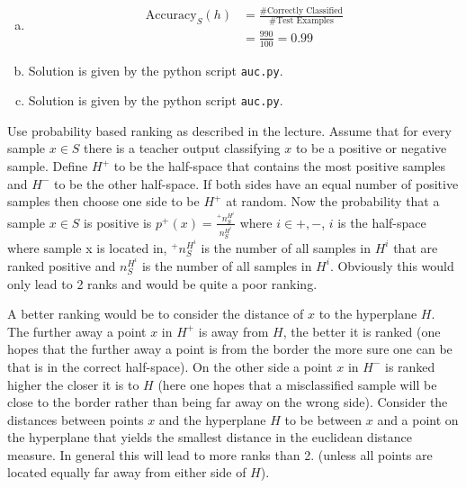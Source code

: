 \documentclass[10pt,a4paper,boxed]{hmcpset}
\begin{document}
		\begin{problem}[4. AUC]
				\end{problem}
		
		\begin{solution}		
					\begin{enumerate}[(a)]
						\item 
							\begin{align*}
								\textrm{Accuracy}_S(h) & = \frac{\textrm{\# Correctly Classified}}{\textrm{\#Test Examples}}\\
												       & = \frac{990}{100} = 0.99
							\end{align*}

						\item Solution is given by the python script \verb$auc.py$.
						\item Solution is given by the python script \verb$auc.py$.
					\end{enumerate}
		\end{solution}
		
		\begin{problem}[5. AUC]
		\end{problem}
		\begin{solution}
			Use probability based ranking as described in the lecture. Assume that for every sample $x\in S$ there is a teacher output classifying $x$ to be a positive or negative sample. Define $H^+$ to be the half-space that contains the most positive samples and $H^-$ to be the other half-space. If both sides have an equal number of positive samples then choose one side to be $H^+$ at random. Now the probability that a sample $x\in S$ is positive is $p^+(x)=\frac{^+ n_S^{H^i}}{n_S^{H^i}}$ where $i\in{+,-}$, $i$ is the half-space where sample x is located in, $^+ n_S^{H^i}$ is the number of all samples in $H^i$ that are ranked positive and $n_S^{H^i}$ is the number of all samples in $H^i$. Obviously this would only lead to 2 ranks and would be quite a poor ranking.
			
			A better ranking would be to consider the distance of $x$ to the hyperplane $H$. The further away a point $x$ in $H^+$ is away from $H$, the better it is ranked (one hopes that the further away a point is from the border the more sure one can be that is in the correct half-space). On the other side a point $x$ in $H^-$ is ranked higher the closer it is to $H$ (here one hopes that a misclassified sample will be close to the border rather than being far away on the wrong side). Consider the distances between points $x$ and the hyperplane $H$ to be between $x$ and a point on the hyperplane that yields the smallest distance in the euclidean distance measure. In general this will lead to more ranks than 2. (unless all points are located equally far away from either side of $H$).
		\end{solution}
		
	
\end{document}
